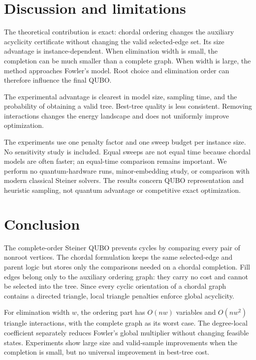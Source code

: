 \documentclass[10pt,a4paper]{article}
\begin{document}
\section{Discussion and limitations}

The theoretical contribution is exact: chordal ordering changes the auxiliary
acyclicity certificate without changing the valid selected-edge set. Its size
advantage is instance-dependent. When elimination width is small, the
completion can be much smaller than a complete graph. When width is large, the
method approaches Fowler's model. Root choice and elimination order can
therefore influence the final QUBO.

The experimental advantage is clearest in model size, sampling time, and the
probability of obtaining a valid tree. Best-tree quality is less consistent.
Removing interactions changes the energy landscape and does not uniformly
improve optimization.

The experiments use one penalty factor and one sweep budget per instance size.
No sensitivity study is included. Equal sweeps are not equal time because
chordal models are often faster; an equal-time comparison remains important.
We perform no quantum-hardware runs, minor-embedding study, or comparison with
modern classical Steiner solvers. The results concern QUBO representation and
heuristic sampling, not quantum advantage or competitive exact optimization.

\section{Conclusion}

The complete-order Steiner QUBO prevents cycles by comparing every pair of
nonroot vertices. The chordal formulation keeps the same selected-edge and
parent logic but stores only the comparisons needed on a chordal completion.
Fill edges belong only to the auxiliary ordering graph: they carry no cost and
cannot be selected into the tree. Since every cyclic orientation of a chordal
graph contains a directed triangle, local triangle penalties enforce global
acyclicity.

For elimination width $w$, the ordering part has $O(nw)$ variables and
$O(nw^2)$ triangle interactions, with the complete graph as its worst case.
The degree-local coefficient separately reduces Fowler's global multiplier
without changing feasible states. Experiments show large size and valid-sample
improvements when the completion is small, but no universal improvement in
best-tree cost.
\end{document}
